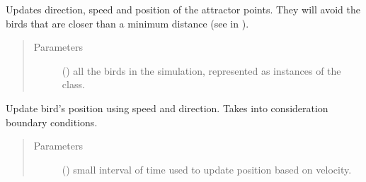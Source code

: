 \documentclass[a4paper,11pt,oneside,english]{sphinxmanual}
\begin{document}
\begin{fulllineitems}
\begin{fulllineitems}
\begin{quote}
\begin{description}
\begin{itemize}
\end{itemize}

\end{description}\end{quote}

\bigskip 
\bigskip 

\end{fulllineitems}


\begin{fulllineitems}
\label{\detokenize{bird:bird.Bird.updateAttractor}}
Updates direction, speed and position of the attractor points. 
They will avoid the birds that are closer than a minimum distance (see  in {\hyperref[\detokenize{parameters:module-0}]{}}).
\begin{quote}\begin{description}
\item[{Parameters}] \leavevmode
{} () \textendash{} all the birds in the simulation, represented as instances of the {\hyperref[\detokenize{bird:bird.Bird}]{}} class.

\end{description}\end{quote}

\bigskip 
\bigskip 

\end{fulllineitems}


\begin{fulllineitems}
\label{\detokenize{bird:bird.Bird.updatePos}}
Update bird’s position using speed and direction.
Takes into consideration boundary conditions.
\begin{quote}\begin{description}
\item[{Parameters}] \leavevmode
{} () \textendash{} small interval of time used to update position based on velocity.


\end{description}
\end{quote}
\end{fulllineitems}
\end{fulllineitems}
\end{document}
